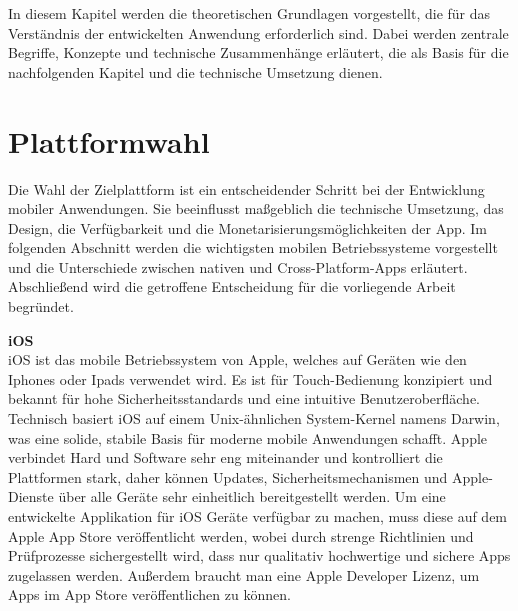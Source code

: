 In diesem Kapitel werden die theoretischen Grundlagen vorgestellt, die für das Verständnis der entwickelten Anwendung erforderlich sind. Dabei werden zentrale Begriffe, Konzepte und technische Zusammenhänge erläutert, die als Basis für die nachfolgenden Kapitel und die technische Umsetzung dienen.
\section{Plattformwahl}
Die Wahl der Zielplattform ist ein entscheidender Schritt bei der Entwicklung mobiler Anwendungen. Sie beeinflusst maßgeblich die technische Umsetzung, das Design, die Verfügbarkeit und die Monetarisierungsmöglichkeiten der App. Im folgenden Abschnitt werden die wichtigsten mobilen Betriebssysteme vorgestellt und die Unterschiede zwischen nativen und Cross-Platform-Apps erläutert. Abschließend wird die getroffene Entscheidung für die vorliegende Arbeit begründet.

\textbf{iOS}\\
iOS ist das mobile Betriebssystem von Apple, welches auf Geräten wie den Iphones oder Ipads verwendet wird. 
Es ist für Touch-Bedienung konzipiert und bekannt für hohe Sicherheitsstandards und eine intuitive 
Benutzeroberfläche. Technisch basiert iOS auf einem Unix-ähnlichen System-Kernel 
namens Darwin, was eine solide, stabile Basis für moderne mobile Anwendungen schafft. Apple verbindet Hard und Software sehr eng miteinander und kontrolliert
die Plattformen stark, daher können Updates, Sicherheitsmechanismen und Apple-Dienste über alle Geräte sehr einheitlich 
bereitgestellt werden. Um eine entwickelte Applikation für iOS Geräte verfügbar zu machen, muss diese auf dem Apple App Store veröffentlicht werden,
wobei durch strenge Richtlinien und Prüfprozesse sichergestellt wird, dass nur qualitativ hochwertige und sichere Apps zugelassen werden. Außerdem braucht man 
eine Apple Developer Lizenz, um Apps im App Store veröffentlichen zu können.\cite{ComputerWeekly_Apple_iOS} \cite{IT_Schulungen_Was_ist_iOS} \cite{Ionos_IOS_App_Entwicklung} 

